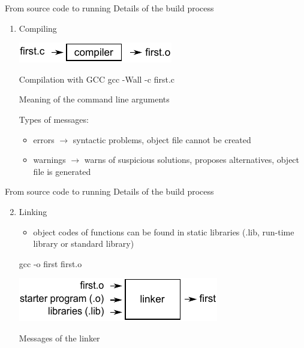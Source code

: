 \documentclass[usenames,dvipsnames,aspectratio=169]{beamer}
\begin{document}
\begin{frame}{From source code to running}
  Details of the build process
  \begin{enumerate}
    \item Compiling
    \begin{center}
      \includegraphics{compiling.pdf}
    \end{center}
    \begin{block}{Compilation with GCC}
      gcc -Wall -c first.c
    \end{block}
    \begin{exampleblock}{Meaning of the command line arguments}
    \end{exampleblock}
    Types of messages:
    \begin{itemize}
      \item errors $\rightarrow$ syntactic problems, object file cannot be created
      \item warnings $\rightarrow$ warns of suspicious solutions, proposes alternatives, object file is generated
    \end{itemize}
  \end{enumerate}
\end{frame}

\begin{frame}[fragile]{From source code to running}
  Details of the build process
  \begin{enumerate}
    \setcounter{enumi}{1}
    \item Linking
    \begin{itemize}
      \item object codes of functions can be found in static libraries (.lib, run-time library or standard library)
    \end{itemize}
    \begin{block}{}
      gcc -o first first.o
    \end{block}
    \begin{center}
      \includegraphics{linker.pdf}
    \end{center}
    Messages of the linker
  \end{enumerate}
\end{frame}
\end{document}
